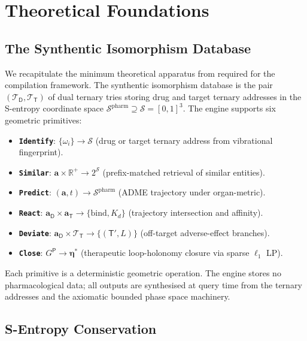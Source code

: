 \documentclass[11pt,twocolumn,a4paper]{article}
\theoremstyle{definition}
\theoremstyle{remark}
\newcommand{\Sspace}{\mathcal{S}}
\newcommand{\R}{\mathbb{R}}
\newcommand{\addr}{\mathbf{a}}
\newcommand{\drugaddr}{\mathbf{a}_{\mathsf{D}}}
\newcommand{\targaddr}{\mathbf{a}_{\mathsf{T}}}
\begin{document}
\section{Theoretical Foundations}
\label{sec:foundations}

\subsection{The Synthentic Isomorphism Database}

We recapitulate the minimum theoretical apparatus from \citep{sachikonye2025e} required for the compilation framework. The synthentic isomorphism database is the pair $(\mathcal{T}_\mathsf{D}, \mathcal{T}_\mathsf{T})$ of dual ternary tries storing drug and target ternary addresses in the S-entropy coordinate space $\Sspace^{\mathrm{pharm}} \supseteq \Sspace = [0,1]^3$. The engine supports six geometric primitives:

\begin{itemize}[nosep,leftmargin=*]
\item \textbf{\texttt{Identify}}: $\{\omega_i\} \to \Sspace$ (drug or target ternary address from vibrational fingerprint).
\item \textbf{\texttt{Similar}}: $\addr \times \R^+ \to 2^{\Sspace}$ (prefix-matched retrieval of similar entities).
\item \textbf{\texttt{Predict}}: $(\addr, t) \to \Sspace^{\mathrm{pharm}}$ (ADME trajectory under organ-metric).
\item \textbf{\texttt{React}}: $\drugaddr \times \targaddr \to \{\mathrm{bind}, K_d\}$ (trajectory intersection and affinity).
\item \textbf{\texttt{Deviate}}: $\drugaddr \times \mathcal{T}_\mathsf{T} \to \{(\mathsf{T}', L)\}$ (off-target adverse-effect branches).
\item \textbf{\texttt{Close}}: $G^{\mathsf{P}} \to \boldsymbol{\eta}^*$ (therapeutic loop-holonomy closure via sparse $\ell_1$ LP).
\end{itemize}

Each primitive is a deterministic geometric operation. The engine stores no pharmacological data; all outputs are synthesised at query time from the ternary addresses and the axiomatic bounded phase space machinery.

\subsection{S-Entropy Conservation}
\end{document}
